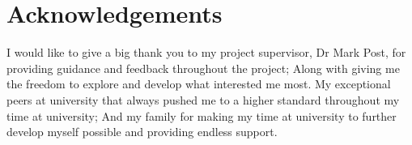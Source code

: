 \section*{Acknowledgements}
\addtocounter{section}{1}
I would like to give a big thank you to my project supervisor, Dr Mark Post, for providing guidance and feedback throughout the project; Along with giving me the freedom to explore and develop what interested me most.  My exceptional peers at university that always pushed me to a higher standard throughout my time at university; And my family for making my time at university to further develop myself possible and providing endless support.